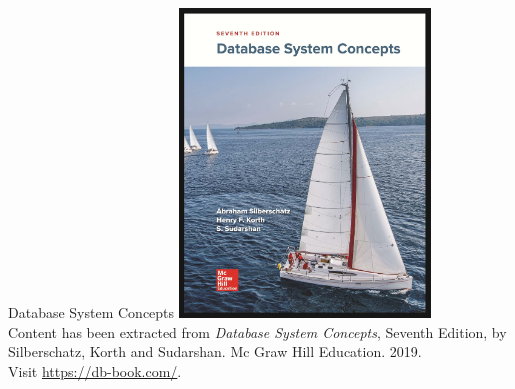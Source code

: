 \documentclass{beamer}
\begin{document}
% 
% 

\begin{frame}{Database System Concepts}
    \centering
    \includegraphics[width=0.5\textwidth]{figures/book_cover.jpg} \\
    \vspace{5mm}
    {
        \tiny
        Content has been extracted from \textit{Database System Concepts}, Seventh Edition, by Silberschatz, Korth and Sudarshan. Mc Graw Hill Education. 2019.\\
        Visit \url{https://db-book.com/}.\\
    }
\end{frame}
\end{document}
